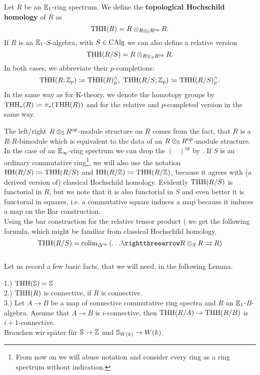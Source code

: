 \begin{defn}
    Let $R$ be an $\Eone$-ring spectrum.
    We define the \textbf{topological Hochschild homology} of $R$ as 
    \begin{equation*}
        \THH(R)=R\otimes_{R\otimes_\S R^{op}}R.
    \end{equation*}
    If $R$ is an $\Eone$-$S$-algebra, with $S\in\CAlg$ we can also define a relative version
    \begin{equation*}
        \THH(R/S)=R\otimes_{R\otimes_S R^{op}}R.
    \end{equation*}
    In both cases, we abbreviate their $p$-completions:
    \begin{equation*}
        \THH(R;\Z_p)\coloneqq\THH(R)^{\wedge}_p,\ \THH(R/S;\Z_p)\coloneqq\THH(R/S)^{\wedge}_p.
    \end{equation*}
    In the same way as for K-theory, we denote the homotopy groups by $\THH_*(R)\coloneqq \pi_*(\THH(R))$ and for the relative and $p$-completed version in the same way.
\end{defn}
The left/right $R\otimes_\S R^{\op}$-module structure on $R$ comes from the fact, that $R$ is a $R$-$R$-bimodule which is equivalent to the data of an $R\otimes_\S R^{\op}$-module structure. 
In the case of an $\Einf$-ring spectrum we can drop the $(\phantom{R})^{op}$ by \cite[Section~4.6.3]{lurie2017higher}. 
If $S$ is an ordinary commutative ring\footnote{From now on we will abuse notation and consider every ring as a ring spectrum without indication.}, we will also use the notation $\HH(R/S)\coloneqq \THH(R/S)$ and $\HH(R/\Z)\coloneqq \THH(R/\Z)$, because it agrees with (a derived version of) classical Hochschild homology.
Evidently $\THH(R/S)$ is functorial in $R$, but we note that it is also functorial in $S$ and even better it is functorial in squares, i.e. a commutative square induces a map because it induces a map on the Bar construction.\\ 
Using the bar construction for the relative tensor product (\cite[Section~4.4.2]{lurie2017higher} we get the following formula, which might be familiar from classical Hochschild homology.
\begin{equation*}
    \THH(R/S)=\colim_{\Delta^{\op}}\left(\dots \rightthreearrow R\otimes_S R\rightrightarrows R\right)
\end{equation*}
\\
Let us record a few basic facts, that we will need, in the following Lemma.
\begin{lem}
    1.) $\THH(\S)=\S$ \\
    2.) $\THH(R)$ is connective, if $R$ is connective. \\
    3.) Let $A\to B$ be a map of connective commutative ring spectra and $R$ an $\Eone$-$B$-algebra. Assume that $A\to B$ is $i$-connective, then $\THH(R/A)\to \THH(R/B)$ is $i+1$-connective. \\
    Brauchen wir später für $\S\to \Z$ und $\S_{W(k)}\to W(k)$.
\end{lem}
